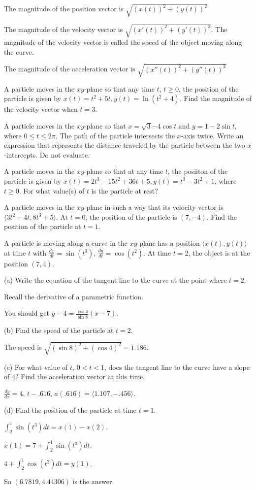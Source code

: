 \documentclass[../bccalc.tex]{subfiles}
\begin{document}
The magnitude of the position vector is $\sqrt{(x(t))^2+(y(t))^2}$

The magnitude of the velocity vector is $\sqrt{(x'(t))^2+(y'(t))^2}$. The magnitude of the velocity vector is called the speed of the object moving along the curve.

The magnitude of the acceleration vector is $\sqrt{(x''(t))^2+(y''(t))^2}$

\ex A particle moves in the $xy$-plane so that any time $t$, $t\geq 0$, the position of the particle is given by $x(t)=t^2+5t, y(t)=\ln (t^2+4)$. Find the magnitude of the velocity vector when $t=3$.

\ex A particle moves in the $xy$-plane so that $x=\sqrt{3}{-4\cos t}$ and $y=1-2\sin t$, where $0\leq t\leq 2\pi$. The path of the particle intersects the $x$-axis twice. Write an expression that represents the distance traveled by the particle between the two $x$-intercepts. Do not evaluate.

\ex A particle moves in the $xy$-plane so that at any time $t$, the posiiton of the particle is given by $x(t)=2t^3-15t^2+36t+5, y(t)=t^3-3t^2+1$, where $t\geq 0$. For what value(s) of $t$ is the particle at rest?

\ex A particle moves in the $xy$-plane in such a way that its velocity vector is $\langle 3t^2-4t, 8t^3+5\rangle$. At $t=0$, the position of the particle is $(7,-4)$. Find the position of the particle at $t=1$.

\begin{example}
    A particle is moving along a curve in the $xy$-plane has a position $\langle x(t),y(t)\rangle$ at time $t$ with $\frac{dx}{dt}=\sin(t^3)$, $\frac{dy}{dt}=\cos (t^2)$. At time $t=2$, the object is at the position $(7,4)$.

    (a) Write the equation of the tangent line to the curve at the point where $t=2$.

    Recall the derivative of a parametric function.

    You should get $y-4=\frac{\cos 4}{\sin 8}(x-7)$.

    (b) Find the speed of the particle at $t=2$.

    The speed is $\sqrt{(\sin 8)^2+(\cos 4)^2}=1.186$.

    (c) For what value of $t$, $0<t<1$, does the tangent line to the curve have a slope of 4? Find the acceleration vector at this time.

    $\frac{dy}{dx}=4$, $t-.616$, $a(.616)=\langle 1.107, -.456\rangle$.

    (d) Find the position of the particle at time $t=1$.

    $\int_2^1 \sin(t^3)dt = x(1)-x(2)$.

    $x(1)=7+\int_2^1 \sin(t^3)dt$.

    $4+\int_2^1 \cos(t^2)dt=y(1)$.

    So $(6.7819, 4.44306)$ is the answer.
\end{example}
\end{document}
